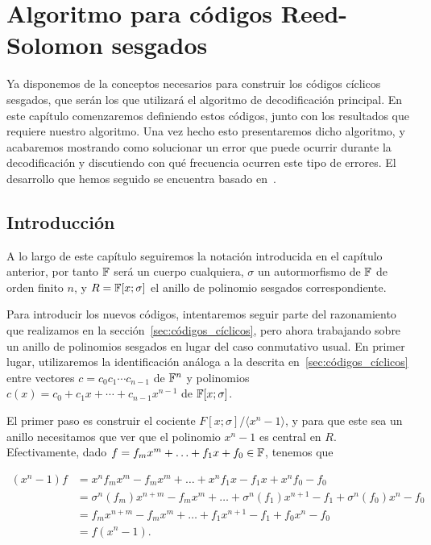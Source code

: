 \chapter{Algoritmo para códigos Reed-Solomon sesgados}%
\label{chap:algoritmo}

Ya disponemos de la conceptos necesarios para construir los códigos cíclicos sesgados, que serán los que utilizará el algoritmo de decodificación principal. En este capítulo comenzaremos definiendo estos códigos, junto con los resultados que requiere nuestro algoritmo. Una vez hecho esto presentaremos dicho algoritmo, y acabaremos mostrando como solucionar un error que puede ocurrir durante la decodificación y discutiendo con qué frecuencia ocurren este tipo de errores. El desarrollo que hemos seguido se encuentra basado en~\cite{gomez-torrecillas_sugiyama_2016}.

\section{Introducción}

A lo largo de este capítulo seguiremos la notación introducida en el capítulo anterior, por tanto \(\mathbb{F}\) será un cuerpo cualquiera,  \(\sigma\) un autormorfismo de  \(\mathbb{F}\) de orden finito  \(n\), y \(R = \mathbb{F}[x;\sigma]\) el anillo de polinomio sesgados correspondiente.

Para introducir los nuevos códigos, intentaremos seguir parte del razonamiento que realizamos en la sección~\ref{sec:códigos_cíclicos}, pero ahora trabajando sobre un anillo de polinomios sesgados en lugar del caso conmutativo usual. En primer lugar, utilizaremos la identificación análoga a la descrita en~\ref{sec:códigos_cíclicos} entre vectores \(c = c_0 c_1\cdots c_{n-1}\) de \(\mathbb{F}^n\) y polinomios \(c(x) = c_0 + c_1x + \cdots + c_{n-1}x^{n-1}\) de \(\mathbb{F}[x;\sigma]\).

El primer paso es construir el cociente \(F[x;\sigma]/\langle x^{n}-1\rangle\), y para que este sea un anillo necesitamos que ver que el polinomio \(x^{n} - 1\) es central en \(R\). Efectivamente, dado \(f = f_m x^m + \ldots + f_1x + f_0 \in \mathbb{F}\), tenemos que

\[
\begin{aligned}
(x^n-1)f &= x^n f_m x^m - f_m x^m + \dots + x^n f_1 x - f_1 x + x^n f_0 - f_0 \\
&= \sigma^n(f_m)x^{n+m} - f_m x^m + \dots + \sigma^n(f_1)x^{n+1} - f_1 + \sigma^n(f_0)x^n - f_0\\
&= f_mx^{n+m} - f_m x^m + \dots + f_1x^{n+1} - f_1 + f_0x^n - f_0\\
&= f(x^n -1).
\end{aligned}
\]

